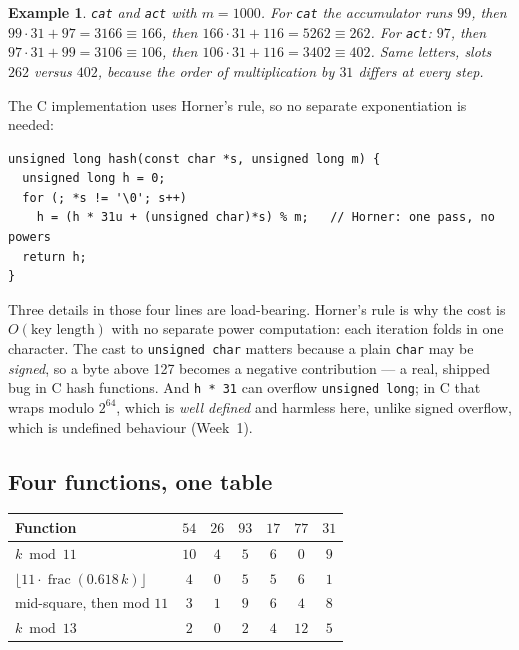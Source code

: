 \documentclass[11pt]{article}
\newtheorem{example}{Example}[section]
\begin{document}
\begin{example}
\emph{\texttt{cat} and \texttt{act} with $m = 1000$.} For \texttt{cat} the accumulator runs $99$, then $99\cdot31 + 97 = 3166 \equiv 166$, then $166\cdot31 + 116 = 5262 \equiv 262$. For \texttt{act}: $97$, then $97\cdot31 + 99 = 3106 \equiv 106$, then $106\cdot31 + 116 = 3402 \equiv 402$. Same letters, slots $262$ versus $402$, because the order of multiplication by $31$ differs at every step.
\end{example}

The C implementation uses Horner's rule, so no separate exponentiation is needed:

\begin{verbatim}
unsigned long hash(const char *s, unsigned long m) {
  unsigned long h = 0;
  for (; *s != '\0'; s++)
    h = (h * 31u + (unsigned char)*s) % m;   // Horner: one pass, no powers
  return h;
}
\end{verbatim}

Three details in those four lines are load-bearing. Horner's rule is why the cost is $O(\text{key length})$ with no separate power computation: each iteration folds in one character. The cast to \texttt{unsigned char} matters because a plain \texttt{char} may be \emph{signed}, so a byte above 127 becomes a negative contribution --- a real, shipped bug in C hash functions. And \texttt{h * 31} can overflow \texttt{unsigned long}; in C that wraps modulo $2^{64}$, which is \emph{well defined} and harmless here, unlike signed overflow, which is undefined behaviour (Week~1).

\subsection{Four functions, one table}

\begin{center}
{\footnotesize
\begin{tabular}{lcccccc}
  \toprule
  Function & $54$ & $26$ & $93$ & $17$ & $77$ & $31$ \\
  \midrule
  $k \bmod 11$ & $10$ & $4$ & $5$ & $6$ & $0$ & $9$ \\
  $\lfloor 11 \cdot \operatorname{frac}(0.618\,k)\rfloor$
    & $4$ & $0$ & $5$ & $5$ & $6$ & $1$ \\
  mid-square, then mod $11$ & $3$ & $1$ & $9$ & $6$ & $4$ & $8$ \\
  $k \bmod 13$ & $2$ & $0$ & $2$ & $4$ & $12$ & $5$ \\
  \bottomrule
\end{tabular}}
\end{center}
\end{document}
